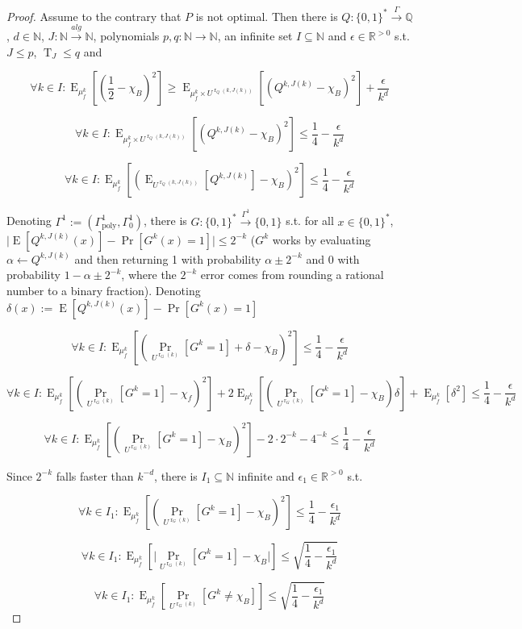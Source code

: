 \documentclass{article}
\numberwithin{equation}{section}
\theoremstyle{definition}
\theoremstyle{plain}
\newcommand{\Words}{{\{ 0, 1 \}^*}}
\newcommand{\Bool}{\{0,1\}}
\DeclareMathOperator{\Prb}{Pr}
\DeclareMathOperator{\E}{E}
\DeclareMathOperator{\T}{T}
\DeclareMathOperator{\R}{r}
\newcommand{\Nats}{\mathbb{N}}
\newcommand{\Rats}{\mathbb{Q}}
\newcommand{\Reals}{\mathbb{R}}
\newcommand{\Abs}[1]{\lvert #1 \rvert}
\begin{document}
\begin{proof}

Assume to the contrary that $P$ is not optimal. Then there is ${Q: \Words \xrightarrow{\Gamma} \Rats}$, $d \in \Nats$, $J: \Nats \xrightarrow{alg} \Nats$, polynomials $p,q: \Nats \rightarrow \Nats$, an infinite set ${I \subseteq \Nats}$ and $\epsilon \in \Reals^{>0}$ s.t. $J \leq p$, $\T_J \leq q$ and

$$ \forall k \in I: \E_{\mu_f^k}[(\frac{1}{2}-\chi_B)^2] \geq \E_{\mu_f^k \times U^{\R_Q(k,J(k))}}[(Q^{k,J(k)}-\chi_B)^2] +\frac{\epsilon}{k^d}$$

$$ \forall k \in I: \E_{\mu_f^k \times U^{\R_Q(k,J(k))}}[(Q^{k,J(k)}-\chi_B)^2] \leq \frac{1}{4} - \frac{\epsilon}{k^d} $$

$$ \forall k \in I: \E_{\mu_f^k}[(\E_{U^{\R_Q(k,J(k))}}[Q^{k,J(k)}]-\chi_B)^2] \leq \frac{1}{4} - \frac{\epsilon}{k^d} $$

Denoting $\Gamma^1:=(\Gamma_{\text{poly}}^1,\Gamma_0^1)$, there is $G: \Words \xrightarrow{\Gamma^1} \Bool$ s.t. for all ${x \in \Words}$, ${\Abs{\E[Q^{k,J(k)}(x)]-\Pr[G^k(x)=1]}\leq 2^{-k}}$ ($G^k$ works by evaluating ${\alpha \leftarrow Q^{k,J(k)}}$ and then returning 1 with probability $\alpha \pm 2^{-k}$ and 0 with probability $1-\alpha \pm 2^{-k}$, where the $2^{-k}$ error comes from rounding a rational number to a binary fraction). Denoting $\delta(x):=\E[Q^{k,J(k)}(x)]-\Pr[G^k(x)=1]$

$$ \forall k \in I: \E_{\mu_f^k}[(\Prb_{U^{\R_G(k)}}[G^k=1]+\delta-\chi_B)^2] \leq \frac{1}{4} - \frac{\epsilon}{k^d} $$

$$ \forall k \in I: \E_{\mu_f^k}[(\Prb_{U^{\R_G(k)}}[G^k=1]-\chi_f)^2]+2 \E_{\mu_f^k}[(\Prb_{U^{\R_G(k)}}[G^k=1]-\chi_B)\delta]+\E_{\mu_f^k}[\delta^2] \leq \frac{1}{4} - \frac{\epsilon}{k^d}$$

$$ \forall k \in I: \E_{\mu_f^k}[(\Prb_{U^{\R_G(k)}}[G^k=1]-\chi_B)^2]-2 \cdot 2^{-k}- 4^{-k} \leq \frac{1}{4} - \frac{\epsilon}{k^d}$$

Since $2^{-k}$ falls faster than $k^{-d}$, there is $I_1 \subseteq \Nats$ infinite and $\epsilon_1 \in \Reals^{>0}$ s.t.

$$ \forall k \in I_1: \E_{\mu_f^k}[(\Prb_{U^{\R_G(k)}}[G^k=1]-\chi_B)^2] \leq \frac{1}{4} - \frac{\epsilon_1}{k^d}$$

$$ \forall k \in I_1: \E_{\mu_f^k}[\Abs{\Prb_{U^{\R_G(k)}}[G^k=1]-\chi_B}] \leq \sqrt{\frac{1}{4} - \frac{\epsilon_1}{k^d}} $$

$$ \forall k \in I_1: \E_{\mu_f^k}[\Prb_{U^{\R_G(k)}}[G^k \ne \chi_B]] \leq \sqrt{\frac{1}{4} - \frac{\epsilon_1}{k^d}} $$


\end{proof}
\end{document}
